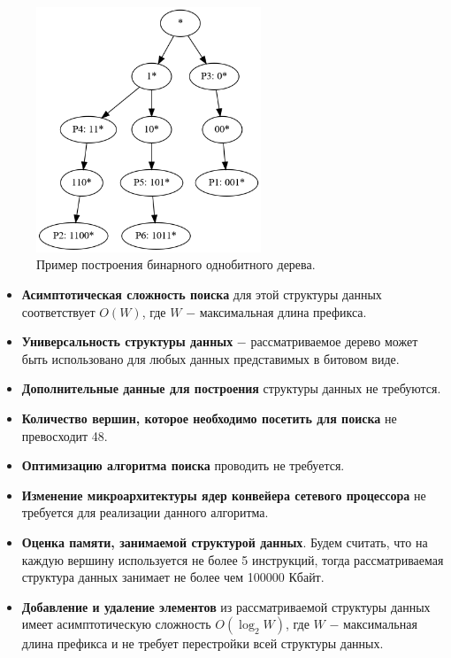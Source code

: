 \documentclass[a4paper, 12pt, titlepage, finall]{extreport}
\begin{document}
            \begin{figure}[h]      
                \centering 
                \includegraphics[width=0.6\textwidth]{binary.png}
                \caption{Пример построения бинарного однобитного дерева.}\label{fig:mesh1}
            \end{figure}
            
            \begin{itemize}
                \item\textbf{Асимптотическая сложность поиска} для этой структуры данных соответствует {\ttfamily $O(W)$},
                где {\ttfamily $W$} $-$ максимальная длина префикса.
                \item\textbf{Универсальность структуры данных} $-$ рассматриваемое дерево может быть использовано для любых данных представимых в битовом виде.
                \item\textbf{Дополнительные данные для построения} структуры данных не требуются.
                \item\textbf{Количество вершин, которое необходимо посетить для поиска} не превосходит 48.
                \item\textbf{Оптимизацию алгоритма поиска} проводить не требуется.
                \item\textbf{Изменение микроархитектуры ядер конвейера сетевого процессора} не требуется для реализации данного алгоритма.
                \item\textbf{Оценка памяти, занимаемой структурой данных}. Будем считать, что на каждую вершину используется не более 5 инструкций,
                тогда рассматриваемая структура данных занимает не более чем 100000 Кбайт.
                \item\textbf{Добавление и удаление элементов} из рассматриваемой структуры данных имеет асимптотическую сложность 
            {\ttfamily $O(\log_2{W})$}, где {\ttfamily $W$} $-$ максимальная длина префикса и не требует перестройки всей структуры данных.\\
            \end{itemize}
\end{document}
